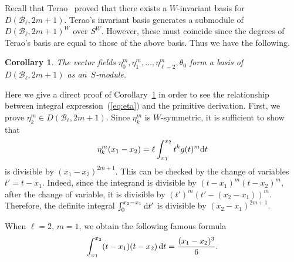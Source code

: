 \documentclass[pdftex]{sigma}
\numberwithin{equation}{section}
\newtheorem{Corollary}[Theorem]{Corollary}
\newcommand{\B}{\mathcal{B}}
\begin{document}
Recall that Terao~\cite{ter-mult} proved that there exists a $W$-invariant basis
for $D(\B_\ell, 2m+1)$. Terao's invariant basis generates a submodule
of $D(\B_\ell, 2m+1)^W$ over $S^W$. However, these must coincide since
the degrees of Terao's basis are equal to those of the above basis.
Thus we have the following.
\begin{Corollary}
\label{cor:multibasis}
The vector fields
$\eta_0^m, \eta_1^m, \dots, \eta_{\ell-2}^m, \theta_0$ form a
basis of $D(\B_\ell, 2m+1)$ as an~$S$-module.
\end{Corollary}
Here we give a direct proof of Corollary~\ref{cor:multibasis} in order to see
the relationship between integral expression~(\ref{eq:eta}) and
the primitive derivation.
First, we prove $\eta_k^m\in D(\B_\ell, 2m+1)$. Since $\eta_k^m$ is
$W$-symmetric, it is sufficient to show that
\begin{gather*}
\eta_k^m(x_1-x_2)=\ell\int_{x_1}^{x_2}t^kg(t)^m{\rm d}t
\end{gather*}
is divisible by $(x_1-x_2)^{2m+1}$. This can be checked by
the change of variables $t'=t-x_1$.
Indeed, since the integrand is divisible by $(t-x_1)^m(t-x_2)^m$, after the
change of variable, it is divisible by $(t')^m(t'-(x_2-x_1))^m$. Therefore,
the definite integral $\int_0^{x_2-x_1}{\rm d}t'$ is divisible by $(x_2-x_1)^{2m+1}$.

\begin{Example}
When $\ell=2$, $m=1$, we obtain the following famous formula
\begin{gather*}
\int_{x_1}^{x_2}(t-x_1)(t-x_2)\,{\rm d}t=\frac{(x_1-x_2)^3}{6}.
\end{gather*}
\end{Example}
\end{document}
